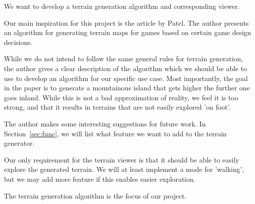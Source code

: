 We want to develop a terrain generation algorithm and corresponding viewer. 

Our main inspiration for this project is the article by Patel\cite{redblob}.
The author presents an algorithm for generating terrain maps for games based on certain game design decisions.

While we do not intend to follow the same general rules for terrain generation, the author gives a clear description of the algorithm which we should be able to use to develop an algorithm for our specific use case.
Most importantly, the goal in the paper is to generate a mountainous island that gets higher the further one goes inland.
While this is not a bad approximation of reality, we feel it is too strong, and that it results in terrains that are not easily explored 'on foot'.

The author makes some interesting suggestions for future work.
In Section~\ref{sec:func}, we will list what feature we want to add to the terrain generator.

Our only requirement for the terrain viewer is that it should be able to easily explore the generated terrain.
We will at least implement a mode for 'walking', but we may add more feature if this enables easier exploration.

The terrain generation algorithm is the focus of our project.

